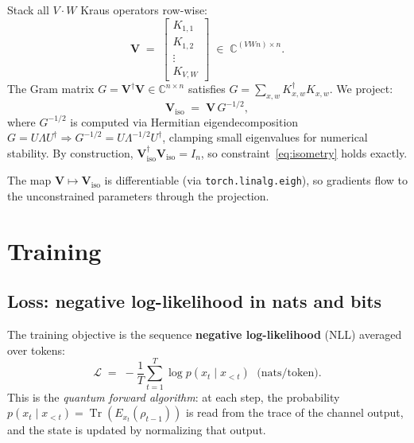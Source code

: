 \documentclass[11pt,a4paper]{article}
\newcommand{\Tr}{\operatorname{Tr}}
\newcommand{\CC}{\mathbb{C}}
\newcommand{\Kx}[2]{K_{#1,#2}}     %
\newcommand{\Ex}[1]{E_{#1}}         %
\theoremstyle{plain}
\begin{document}
Stack all $V\cdot W$ Kraus operators row-wise:
\[
  \mathbf{V} \;=\;
  \begin{bmatrix}
    \Kx{1}{1} \\ \Kx{1}{2} \\ \vdots \\ \Kx{V}{W}
  \end{bmatrix}
  \;\in\; \CC^{(VWn)\times n}.
\]
The Gram matrix $G = \mathbf{V}^\dagger \mathbf{V} \in \CC^{n\times n}$
satisfies $G = \sum_{x,w}\Kx{x}{w}^\dagger\Kx{x}{w}$. We project:
\begin{equation}\label{eq:projection}
  \mathbf{V}_{\mathrm{iso}} \;=\; \mathbf{V}\,G^{-1/2},
\end{equation}
where $G^{-1/2}$ is computed via Hermitian eigendecomposition
$G = U\Lambda U^\dagger \Rightarrow G^{-1/2} = U\Lambda^{-1/2}U^\dagger$,
clamping small eigenvalues for numerical stability. By construction,
$\mathbf{V}_{\mathrm{iso}}^\dagger \mathbf{V}_{\mathrm{iso}} = I_n$,
so constraint~\eqref{eq:isometry} holds exactly.

The map $\mathbf{V} \mapsto \mathbf{V}_{\mathrm{iso}}$ is differentiable
(via \texttt{torch.linalg.eigh}), so gradients flow to the unconstrained
parameters through the projection.

\section{Training}

\subsection{Loss: negative log-likelihood in nats and bits}

The training objective is the sequence \textbf{negative log-likelihood}
(NLL) averaged over tokens:
\begin{equation}\label{eq:loss}
  \mathcal{L} \;=\; -\frac{1}{T}\sum_{t=1}^{T}\log p(x_t \mid x_{<t})
  \;\text{ (nats/token)}.
\end{equation}
This is the \emph{quantum forward algorithm}: at each step, the
probability $p(x_t\mid x_{<t}) = \Tr(\Ex{x_t}(\rho_{t-1}))$ is read
from the trace of the channel output, and the state is updated by
normalizing that output.
\end{document}
